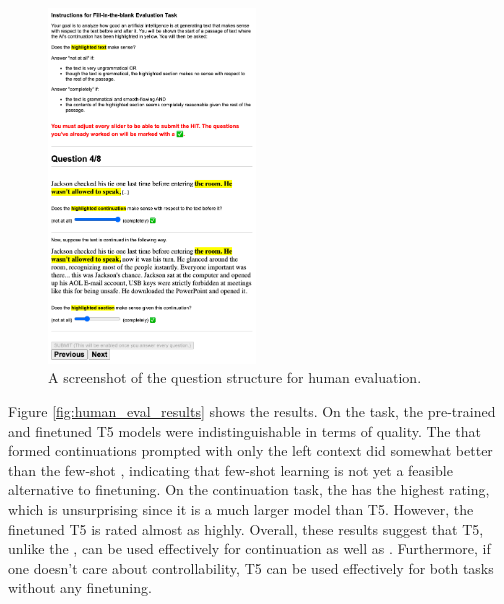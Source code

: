 \begin{figure}[ht]
    \centering
    \includegraphics[width=0.49\textwidth, frame]{figures/amt_screenshot.png}
    \caption{A screenshot of the question structure for human evaluation.}
    \label{fig:amturk_ui}
\end{figure}

Figure \ref{fig:human_eval_results} shows the results.
On the \FitB{} task, the pre-trained and finetuned T5 models were indistinguishable in terms of quality.
The \LLM{} that formed continuations prompted with only the left context did somewhat better than the few-shot \LLM{}, indicating that few-shot learning is not yet a feasible alternative to finetuning.
On the continuation task, the \LLM{} has the highest rating, which is unsurprising since it is a much larger model than T5.
However, the finetuned T5 is rated almost as highly.
Overall, these results suggest that T5, unlike the \LLM{}, can be used effectively for continuation as well as \FitB.
Furthermore, if one doesn't care about controllability, T5 can be used effectively for both tasks without any finetuning.

